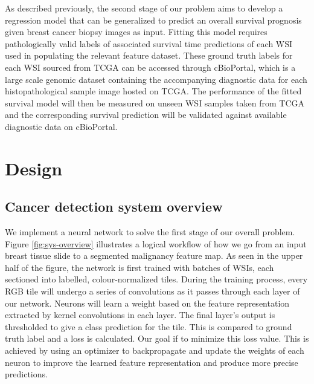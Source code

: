 \documentclass{l4proj}
\begin{document}
As described previously, the second stage of our problem aims to develop a regression model that can be generalized to predict an overall survival prognosis given breast cancer biopsy images as input. Fitting this model requires pathologically valid labels of associated survival time predictions of each WSI used in populating the relevant feature dataset. These ground truth labels for each WSI sourced from TCGA can be accessed through cBioPortal, which is a large scale genomic dataset containing the accompanying diagnostic data for each histopathological sample image hosted on TCGA. The performance of the fitted survival model will then be measured on unseen WSI samples taken from TCGA and the corresponding survival prediction will be validated against available diagnostic data on cBioPortal. 

\chapter{Design}
\section{Cancer detection system overview}
We implement a neural network to solve the first stage of our overall problem. Figure \ref{fig:sys-overview} illustrates a logical workflow of how we go from an input breast tissue slide to a segmented malignancy feature map. As seen in the upper half of the figure, the network is first trained with batches of WSIs, each sectioned into labelled, colour-normalized tiles. During the training process, every RGB tile will undergo a series of convolutions as it passes through each layer of our network. Neurons will learn a weight based on the feature representation extracted by kernel convolutions in each layer. The final layer's output is thresholded to give a class prediction for the tile. This is compared to ground truth label and a loss is calculated. Our goal if to minimize this loss value. This is achieved by using an optimizer to backpropagate and update the weights of each neuron to improve the learned feature representation and produce more precise predictions. 
\end{document}
